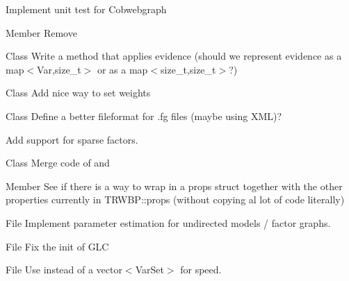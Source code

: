 \begin{DoxyRefList}
%
Implement unit test for Cobwebgraph  
\item[Member \doxylink{structdai_1_1CobwebGraph_1_1Connection_a9072dfec3d0281668d29a5b3efdd8d6f}{dai\+::Cobweb\+Graph\+::Connection\+::newmsg} ]\label{todo__todo000010}%
%
Remove   
\item[Class \doxylink{classdai_1_1FactorGraph}{dai\+::Factor\+Graph} ]\label{todo__todo000013}%
%
Write a method that applies evidence (should we represent evidence as a map$<$\+Var,size\+\_\+t$>$ or as a map$<$size\+\_\+t,size\+\_\+t$>$?)  
\item[Class \doxylink{classdai_1_1FBP}{dai\+::FBP} ]\label{todo__todo000014}%
%
Add nice way to set weights  
\item[Class \doxylink{classdai_1_1TFactor}{dai\+::TFactor\texorpdfstring{$<$}{<} T \texorpdfstring{$>$}{>}} ]\label{todo__todo000012}%
%
Define a better fileformat for .fg files (maybe using XML)? 



Add support for sparse factors.  
\item[Class \doxylink{classdai_1_1TRWBP}{dai\+::TRWBP} ]\label{todo__todo000018}%
%
Merge code of  and   
\item[Member \doxylink{classdai_1_1TRWBP_aa53430394d674704ec20cd3272c4b528}{dai\+::TRWBP\+::nrtrees} ]\label{todo__todo000019}%
%
See if there is a way to wrap  in a props struct together with the other properties currently in TRWBP\+::props (without copying al lot of  code literally)  
\item[File \doxylink{emalg_8h}{emalg.h} ]\label{todo__todo000011}%
%
Implement parameter estimation for undirected models / factor graphs.  
\item[File \doxylink{glc_8h}{glc.h} ]\label{todo__todo000015}%
%
Fix the init of GLC  
\item[File \doxylink{hak_8h}{hak.h} ]\label{todo__todo000016}%
%
Use  instead of a vector$<$\+Var\+Set$>$ for speed. 




\end{DoxyRefList}
